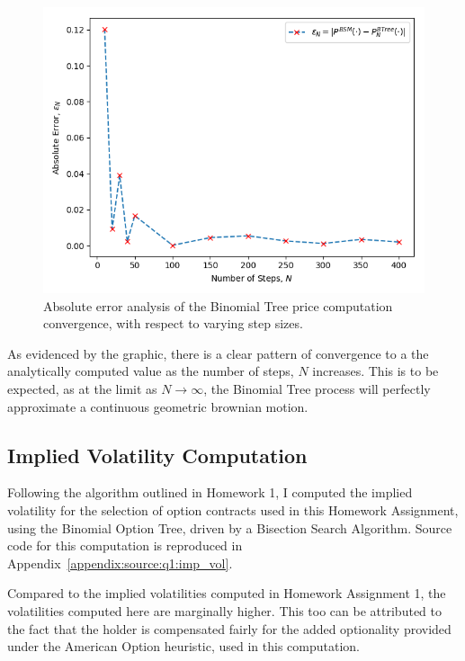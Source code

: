 \documentclass[10pt]{article}
\begin{document}
    \begin{figure}[!ht]
        \includegraphics[]{bin/binomial_abs_error_plot.png}
        \caption{Absolute error analysis of the Binomial Tree price computation convergence, with respect to varying step sizes.}
        \label{fig:binomial_abs_error}
    \end{figure}

    As evidenced by the graphic, there is a clear pattern of convergence to a the analytically computed value as the number of steps, $N$ increases. This is to be expected, as at the limit as $N \rightarrow \infty$, the Binomial Tree process will perfectly approximate a continuous geometric brownian motion.

    \newpage
    \subsection{Implied Volatility Computation}
    
    Following the algorithm outlined in Homework 1, I computed the implied volatility for the selection of option contracts used in this Homework Assignment, using the Binomial Option Tree, driven by a Bisection Search Algorithm. Source code for this computation is reproduced in Appendix~\ref{appendix:source:q1:imp_vol}.

    Compared to the implied volatilities computed in Homework Assignment 1, the volatilities computed here are marginally higher. This too can be attributed to the fact that the holder is compensated fairly for the added optionality provided under the American Option heuristic, used in this computation.
\end{document}
